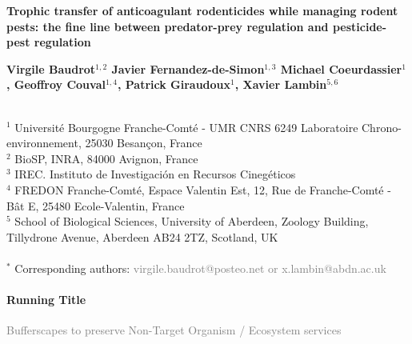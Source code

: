 \documentclass[11pt]{article}
\begin{document}
\begin{center}
	\Large\textbf{
	Trophic transfer of anticoagulant rodenticides while managing rodent pests: the fine line between predator-prey regulation and pesticide-pest regulation
}\par
\end{center}

\vspace{.5cm}

\begin{center}
	\large\textbf{
		Virgile Baudrot$^{1,2}$ 
		Javier Fernandez-de-Simon$^{1,3}$
		Michael Coeurdassier$^1$,
		Geoffroy Couval$^{1,4}$,
		Patrick Giraudoux$^1$,
		Xavier Lambin$^{5,6}$		
	}\par	
\end{center}
~\\
$^1$ Université Bourgogne Franche-Comté - UMR CNRS 6249 Laboratoire Chrono-environnement, 25030 Besançon, France\\
$^2$ BioSP, INRA, 84000 Avignon, France\\
$^3$ IREC. Instituto de Investigación en Recursos Cinegéticos\\
$^4$ FREDON Franche-Comté, Espace Valentin Est, 12, Rue de Franche-Comté - Bât E, 25480 Ecole-Valentin, France\\
$^5$ School of Biological Sciences, University of Aberdeen, Zoology Building, Tillydrone Avenue, Aberdeen AB24 2TZ, Scotland, UK\\
~\\
$^*$ Corresponding authors: \textcolor{gray}{virgile.baudrot@posteo.net or x.lambin@abdn.ac.uk}

\paragraph{Running Title} \textcolor{gray}{Bufferscapes to preserve Non-Target Organism / Ecosystem services}

\vspace{.5cm}
\end{document}
